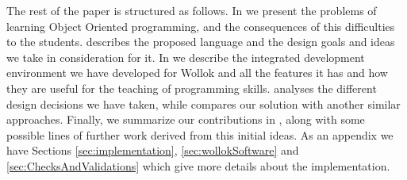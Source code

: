 
\medskip 
The rest of the paper is structured as follows. In  we present the problems of learning Object Oriented programming, and the consequences of this difficulties to the students.  describes the proposed language and the design goals and ideas we take in consideration for it. In  we describe the integrated development environment we have developed for Wollok and all the features it has and how they are useful for the teaching of programming skills.  analyses the different design decisions we have taken, while  compares our solution with another similar approaches. Finally, we summarize our contributions in ,
along with some possible lines of further work derived from this initial ideas. As an appendix we have Sections \ref{sec:implementation}, \ref{sec:wollokSoftware} and \ref{sec:ChecksAndValidations} which give more details about the implementation.


